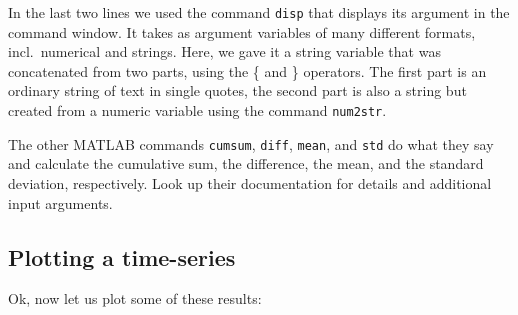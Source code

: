 In the last two lines we used the command \lstinline{disp} that displays its argument in the command window.
It takes as argument variables of many different formats, incl.\ numerical and strings. 
Here, we gave it a string variable that was concatenated from two parts, using the \{ and \} operators.
The first part is an ordinary string of text in single quotes, the second part is also a string but created from a numeric variable using the command \lstinline{num2str}.

The other MATLAB commands \lstinline{cumsum}, \lstinline{diff}, \lstinline{mean}, and \lstinline{std} do what they say and calculate the cumulative sum, the difference, the mean, and the standard deviation, respectively. Look up their documentation for details and additional input arguments.

\subsection{Plotting a time-series}
Ok, now let us plot some of these results: